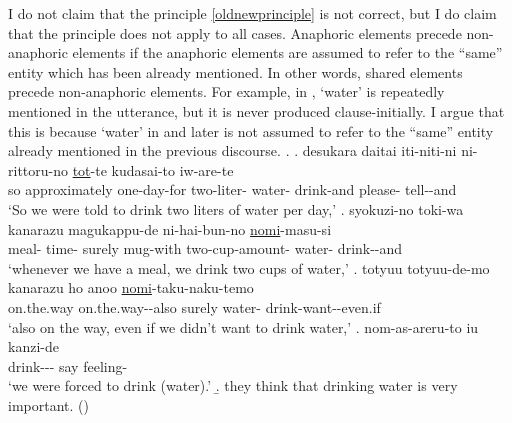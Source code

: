 I do not claim that the principle \ref{oldnewprinciple} is not correct,
but I do claim that the principle does not apply to all cases.
Anaphoric elements precede non-anaphoric elements
if the anaphoric elements are assumed to refer to the ``same'' entity which has been already mentioned.
In other words,
shared elements precede non-anaphoric elements.
For example, in \Next,
 `water' is repeatedly mentioned in the utterance,
but it is never produced clause-initially.
I argue that this is because
 `water' in \Next[b] and later is not assumed to refer to the ``same'' entity already mentioned in the previous discourse.
%
\ex.\label{WO:ClauseInit:Given:mizu}
 \ag. desukara daitai iti-niti-ni ni-rittoru-no  \ul{tot}-te kudasai-to iw-are-te \\
 so approximately one-day-for two-liter- water- drink-and please- tell--and \\
 `So we were told to drink two liters of water per day,'
 \bg. syokuzi-no toki-wa kanarazu magukappu-de ni-hai-bun-no  \ul{nomi}-masu-si \\
 	meal- time- surely mug-with two-cup-amount- water- drink--and \\
	`whenever we have a meal, we drink two cups of water,'
 \bg. totyuu totyuu-de-mo kanarazu  ho anoo \ul{nomi}-taku-naku-temo \\
 		on.the.way on.the.way--also surely water-   drink-want--even.if \\
		`also on the way, even if we didn't want to drink water,'
 \bg. nom-as-areru-to iu kanzi-de \\
 	drink--- say feeling- \\
	`we were forced to drink (water).'
 \b. they think that drinking water is very important.
  \hfill{()}


